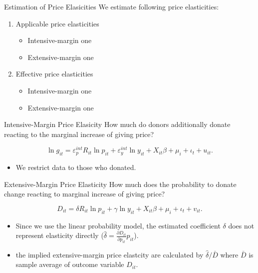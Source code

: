 \documentclass[
  ignorenonframetext,
  aspectratio=169,
]{beamer}
\providecommand{\tightlist}{%
  \setlength{\itemsep}{0pt}\setlength{\parskip}{0pt}}
\begin{document}
\begin{frame}{Estimation of Price Elasicities}
\protect\hypertarget{estimation-of-price-elasicities}{}
We estimate following price elasticities:

\begin{enumerate}
\tightlist
\item
  Applicable price elasticities

  \begin{itemize}
  \tightlist
  \item
    Intensive-margin one
  \item
    Extensive-margin one
  \end{itemize}
\item
  Effective price elasticities

  \begin{itemize}
  \tightlist
  \item
    Intensive-margin one
  \item
    Extensive-margin one
  \end{itemize}
\end{enumerate}
\end{frame}

\begin{frame}{Intensive-Margin Price Elasicity}
\protect\hypertarget{intensive-margin-price-elasicity}{}
How much do donors additionally donate reacting to the marginal increase of giving price?

\begin{equation}
    \ln g_{it} = \varepsilon^{int}_p R_{it} \ln p_{it} + \varepsilon^{int}_y \ln y_{it} 
    + X_{it}\beta +\mu_i +\iota_t +u_{it}. \label{eq:intensive}
\end{equation}

\begin{itemize}
\tightlist
\item
  We restrict data to those who donated.
\end{itemize}
\end{frame}

\begin{frame}{Extensive-Margin Price Elasticity}
\protect\hypertarget{extensive-margin-price-elasticity}{}
How much does the probability to donate change reacting to marginal increase of giving price?

\begin{equation}
D_{it} =  \delta R_{it} \ln p_{it} +\gamma \ln y_{it} + X_{it}\beta +\mu_i  +\iota_t +v_{it}. \label{eq:extensive}
\end{equation}

\begin{itemize}
\tightlist
\item
  Since we use the linear probability model, the estimated coefficient \(\delta\) does not represent elasticity directly (\(\hat{\delta} = \frac{\partial D_{it}}{\partial p_{it}} p_{it}\)).
\item
  the implied extensive-margin price elastcity are calculated by \(\hat{\delta}/\bar{D}\) where \(\bar{D}\) is sample average of outcome variable \(D_{it}\).
\end{itemize}
\end{frame}
\end{document}
